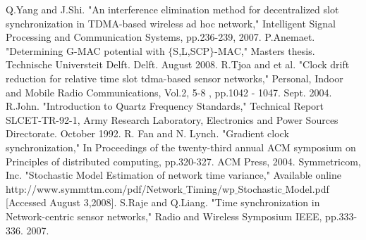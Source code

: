 \documentclass[a4paper,10pt]{report}
\begin{document}
\begin{thebibliography}{\textbf{References}}
Q.Yang and J.Shi. "An interference elimination method for decentralized slot synchronization in TDMA-based wireless ad hoc network," Intelligent Signal Processing and Communication Systems, pp.236-239, 2007.
P.Anemaet. "Determining G-MAC potential with $\{$S,L,SCP$\}$-MAC," Masters thesis. Technische Universteit Delft. Delft. August 2008.
R.Tjoa and et al. "Clock drift reduction for relative time slot tdma-based sensor networks," Personal, Indoor and Mobile Radio Communications, Vol.2, 5-8 , pp.1042 - 1047. Sept. 2004.
R.John. "Introduction to Quartz Frequency Standards," Technical Report SLCET-TR-92-1, Army Research Laboratory, Electronics and Power Sources Directorate. October 1992.
R. Fan and N. Lynch. "Gradient clock synchronization," In Proceedings of the twenty-third annual ACM symposium on Principles of distributed computing, pp.320-327. ACM Press, 2004.
Symmetricom, Inc. "Stochastic Model Estimation of network time variance," Available online http:\slash \slash www.symmttm.com\slash pdf\slash Network$\_$Timing\slash wp$\_$Stochastic$\_$Model.pdf [Accessed August 3,2008].
S.Raje and Q.Liang. "Time synchronization in Network-centric sensor networks," Radio and Wireless Symposium IEEE, pp.333-336. 2007.
\end{thebibliography}
\end{document}

